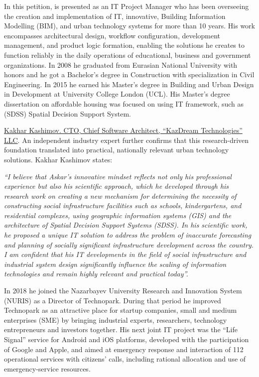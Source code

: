 In this petition, \mrl is presented as an IT Project Manager who has been overseeing the creation and implementation of IT, innovative, Building Information Modelling (BIM), and urban technology systems for more than 10 years.
His work encompasses architectural design, workflow configuration, development management, and product logic formation, enabling the solutions he creates to function reliably in the daily operations of educational, business and government organizations.
In 2008 he graduated from Eurasian National University with honors and he got a Bachelor's degree in Construction with specialization in Civil Engineering. In 2015 he earned his Master's degree in Building and Urban Design in Development at University College London (UCL).
His Master's degree dissertation on affordable housing was focused on using IT framework, such as (SDSS) Spatial Decision Support System.

\noindent\underline{Kakhar Kashimov. CTO, Chief Software Architect, ``KazDream Technologies'' LLC}. An independent industry expert further confirms that this research-driven foundation translated into practical, nationally relevant urban technology solutions. Kakhar Kashimov states:

\textit{``I believe that Askar's innovative mindset reflects not only his professional experience but also his scientific approach, which he developed through his research work on creating a new mechanism for determining the necessity of constructing social infrastructure facilities such as schools, kindergartens, and residential complexes, using geographic information systems (GIS) and the architecture of Spatial Decision Support Systems (SDSS). In his scientific work, he proposed a unique IT solution to address the problem of inaccurate forecasting and planning of socially significant infrastructure development across the country. I am confident that his IT developments in the field of social infrastructure and industrial system design significantly influence the scaling of information technologies and remain highly relevant and practical today''.}

In 2018 he joined the Nazarbayev University Research and Innovation System (NURIS) as a Director of Technopark.
During that period he improved Technopark as an attractive place for startup companies, small and medium enterprises (SME) by bringing industrial experts, researchers, technology entrepreneurs and investors together. His next joint IT project was the ``Life Signal'' service for Android and iOS platforms, developed with the participation of Google and Apple, and aimed at emergency response and interaction of 112 operational services with citizens' calls, including rational allocation and use of emergency-service resources.


